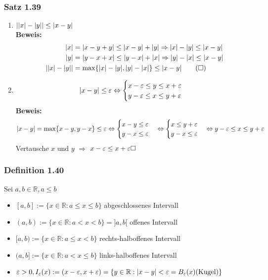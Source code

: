 \documentclass[11pt]{article}
\DeclarePairedDelimiter\abs{\lvert}{\rvert}%
\begin{document}
\subsubsection{Satz 1.39}
\label{sec-2-9-7}
\begin{enumerate}
\item $\abs{\abs{x} - \abs{y}} \leq \abs{x - y}$ \\
       \textbf{Beweis:} \\
\begin{align}
\abs{x} &= \abs{x - y + y} \leq \abs{x - y} + \abs{y} \Rightarrow \abs{x} - \abs{y} \leq \abs{x - y} \\
\abs{y} &= \abs{y - x + x} \leq \abs{y - x} + \abs{x} \Rightarrow \abs{y} - \abs{x} \leq \abs{x - y} \\
\abs{\abs{x} - \abs{y}} &= \max \{\abs{x} - \abs{y},\abs{y} - \abs{x}\} \leq \abs{x - y} \tag{$\square$}
\end{align}
\item \[\abs{x - y} \leq \varepsilon \Leftrightarrow \begin{cases} x - \varepsilon \leq y \leq x + \varepsilon \\ y - \varepsilon \leq x \leq y + \varepsilon \end{cases}\]
       \textbf{Beweis:} \\
\begin{align}
\abs{x - y} = \max\{x - y , y - x\} \leq \varepsilon \Leftrightarrow \begin{cases} x - y \leq \varepsilon \\ y - x \leq \varepsilon\end{cases} \Leftrightarrow \begin{cases} x \leq y + \varepsilon \\ y - x \leq \varepsilon \end{cases} \Leftrightarrow y - \varepsilon \leq x \leq y + \varepsilon
\end{align}
Vertausche $x$ und $y$ $\Rightarrow$ $x - \varepsilon \leq x + \varepsilon \hfill \square$
\end{enumerate}
\subsubsection{Definition 1.40}
\label{sec-2-9-8}
Sei $a,b\in\mathbb{R},a\leq b$
\begin{itemize}
\item $[a,b]:=\{x\in\mathbb{R}: a\leq x \leq b\}$ \hfill abgeschlossenes Intervall
\item $(a,b):= \{x\in\mathbb{R}: a < x < b\} = ]a,b[$ \hfill offenes Intervall
\item $[a,b) := \{x\in\mathbb{R}:a\leq x < b\}$ \hfill rechts-halboffenes Intervall
\item $(a,b]:=\{x\in\mathbb{R}:a<x\leq b\}$ \hfill links-halboffenes Intervall
\item $\varepsilon > 0, I_\varepsilon (x) := (x -\varepsilon,x + \varepsilon) = \{y\in\mathbb{R}:\abs{x - y} < \varepsilon = B_\varepsilon (x) (\text{Kugel})\}$
\end{itemize}
\end{document}

